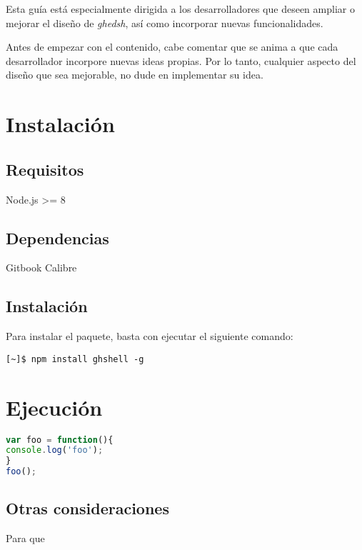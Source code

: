 Esta guía está especialmente dirigida a los desarrolladores que deseen ampliar o mejorar el diseño de {\it ghedsh}, así como incorporar nuevas funcionalidades.
\bigskip

Antes de empezar con el contenido, cabe comentar que se anima a que cada desarrollador incorpore nuevas ideas propias. Por lo tanto, cualquier
aspecto del diseño que sea mejorable, no dude en implementar su idea.

\section{Instalación}
\label{Apendice2:instalacion}

\subsection{Requisitos}
\label{subsec:b.1.1}

Node.js \textgreater = 8

\subsection{Dependencias}
\label{subsec:b.1.2}

Gitbook
Calibre

\subsection{Instalación}
\label{subsec:b.1.3}

Para instalar el paquete, basta con ejecutar el siguiente comando:
\begin{verbatim}
[~]$ npm install ghshell -g
\end{verbatim}


\section{Ejecución}
\label{Apendice2:ejecucion}

\begin{lstlisting}[language=JavaScript]
var foo = function(){
console.log('foo');
}
foo();
\end{lstlisting}
\bigskip

\subsection{Otras consideraciones}
\label{subsec:Apendice2.1}

Para que